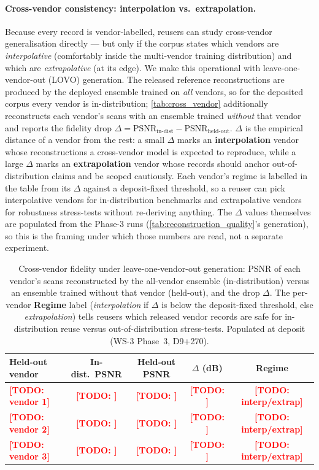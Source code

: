 \documentclass{article}
\newcommand{\todo}[1]{\textcolor{red}{\textbf{[TODO: #1]}}}
\begin{document}
\paragraph{Cross-vendor consistency: interpolation vs.\ extrapolation.}
Because every record is vendor-labelled, reusers can study cross-vendor
generalisation directly --- but only if the corpus states which vendors
are \emph{interpolative} (comfortably inside the multi-vendor training
distribution) and which are \emph{extrapolative} (at its edge). We make
this operational with leave-one-vendor-out (LOVO) generation. The
released reference reconstructions are produced by the deployed ensemble
trained on \emph{all} vendors, so for the deposited corpus every vendor
is in-distribution; \autoref{tab:cross_vendor} additionally reconstructs
each vendor's scans with an ensemble trained \emph{without} that vendor
and reports the fidelity drop $\Delta = \mathrm{PSNR}_{\text{in-dist}} -
\mathrm{PSNR}_{\text{held-out}}$. $\Delta$ is the empirical distance of a
vendor from the rest: a small $\Delta$ marks an \textbf{interpolation}
vendor whose reconstructions a cross-vendor model is expected to
reproduce, while a large $\Delta$ marks an \textbf{extrapolation} vendor
whose records should anchor out-of-distribution claims and be scoped
cautiously. Each vendor's regime is labelled in the table from its
$\Delta$ against a deposit-fixed threshold, so a reuser can pick
interpolative vendors for in-distribution benchmarks and extrapolative
vendors for robustness stress-tests without re-deriving anything. The
$\Delta$ values themselves are populated from the Phase-3 runs
(\autoref{tab:reconstruction_quality}'s generation), so this is the
framing under which those numbers are read, not a separate experiment.

\begin{table}[h]
    \centering
    \small
    \begin{tabular}{lcccc}
        \toprule
        \textbf{Held-out vendor} & \textbf{In-dist.\ PSNR} & \textbf{Held-out PSNR} & \textbf{$\Delta$ (dB)} & \textbf{Regime} \\
        \midrule
        \todo{vendor 1} & \todo{} & \todo{} & \todo{} & \todo{interp/extrap} \\
        \todo{vendor 2} & \todo{} & \todo{} & \todo{} & \todo{interp/extrap} \\
        \todo{vendor 3} & \todo{} & \todo{} & \todo{} & \todo{interp/extrap} \\
        \bottomrule
    \end{tabular}
    \caption{Cross-vendor fidelity under leave-one-vendor-out generation:
    PSNR of each vendor's scans reconstructed by the all-vendor ensemble
    (in-distribution) versus an ensemble trained without that vendor
    (held-out), and the drop $\Delta$. The per-vendor \textbf{Regime}
    label (\emph{interpolation} if $\Delta$ is below the deposit-fixed
    threshold, else \emph{extrapolation}) tells reusers which released
    vendor records are safe for in-distribution reuse versus
    out-of-distribution stress-tests. Populated at deposit
    (WS-3 Phase~3, D9+270).}
    \label{tab:cross_vendor}
\end{table}
\end{document}
